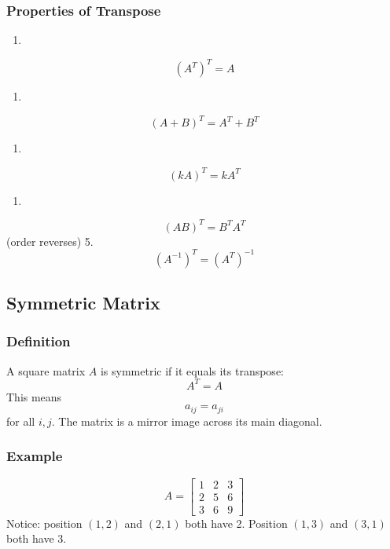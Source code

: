 \documentclass[
]{article}
\providecommand{\tightlist}{%
  \setlength{\itemsep}{0pt}\setlength{\parskip}{0pt}}
\begin{document}
\subsubsection{Properties of Transpose}\label{properties-of-transpose}

\begin{enumerate}
\def\labelenumi{\arabic{enumi}.}
\tightlist
\item
\end{enumerate}
\[
(A^T)^T = A
\]
\begin{enumerate}
\def\labelenumi{\arabic{enumi}.}
\setcounter{enumi}{1}
\tightlist
\item
\end{enumerate}
\[
(A + B)^T = A^T + B^T
\]
\begin{enumerate}
\def\labelenumi{\arabic{enumi}.}
\setcounter{enumi}{2}
\tightlist
\item
\end{enumerate}
\[
(kA)^T = kA^T
\]
\begin{enumerate}
\def\labelenumi{\arabic{enumi}.}
\setcounter{enumi}{3}
\tightlist
\item
\end{enumerate}
\[
(AB)^T = B^T A^T
\]
(order reverses) 5.
\[
(A^{-1})^T = (A^T)^{-1}
\]

\subsection{Symmetric Matrix}\label{symmetric-matrix}

\subsubsection{Definition}\label{definition-6}

A square matrix \(A\) is symmetric if it equals its transpose:
\[
A^T = A
\]
This means
\[
a_{ij} = a_{ji}
\]
for all \(i, j\). The matrix is a mirror image across its main diagonal.

\subsubsection{Example}\label{example}
\[
A =
\begin{bmatrix}
1 & 2 & 3 \\
2 & 5 & 6 \\
3 & 6 & 9
\end{bmatrix}
\]
Notice: position \((1,2)\) and \((2,1)\) both have 2. Position \((1,3)\)
and \((3,1)\) both have 3.
\end{document}
